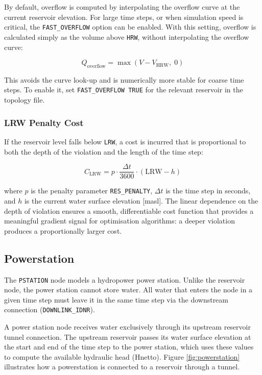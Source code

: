 \documentclass[a4paper, 12pt]{report}
\begin{document}
	By default, overflow is computed by interpolating the overflow curve at the current reservoir
	elevation. For large time steps, or when simulation speed is critical, the \texttt{FAST\_OVERFLOW}
	option can be enabled. With this setting, overflow is calculated simply as the volume above
	\texttt{HRW}, without interpolating the overflow curve:

	$$Q_\mathrm{overflow} = \max\!\left(V - V_\mathrm{HRW},\; 0\right)$$

	This avoids the curve look-up and is numerically more stable for coarse time steps. To enable
	it, set \texttt{FAST\_OVERFLOW TRUE} for the relevant reservoir in the topology file.

	\subsubsection{LRW Penalty Cost}
	\label{subsubsec:lrw_penalty}

	If the reservoir level falls below \texttt{LRW}, a cost is incurred that is proportional to
	both the depth of the violation and the length of the time step:

	$$C_\mathrm{LRW} = p \cdot \frac{\Delta t}{3600} \cdot \left(\mathrm{LRW} - h\right)$$

	where $p$ is the penalty parameter \texttt{RES\_PENALTY}, $\Delta t$ is the time step in
	seconds, and $h$ is the current water surface elevation [masl]. The linear dependence on the
	depth of violation ensures a smooth, differentiable cost function that provides a meaningful
	gradient signal for optimisation algorithms: a deeper violation produces a proportionally
	larger cost.

	\newpage


	\subsection{Powerstation}
	\label{subsec:powerstation}

	The \texttt{PSTATION} node models a hydropower power station. Unlike the reservoir node, the
	power station cannot store water. All water that enters the node in a given time step must leave it
	in the same time step via the downstream connection (\texttt{DOWNLINK\_IDNR}).

	A power station node receives water exclusively through its upstream reservoir tunnel
	connection. The upstream reservoir passes its water surface elevation at the start and end of
	the time step to the power station, which uses these values to compute the available hydraulic
	head (Hnetto). Figure \ref{fig:powerstation} illustrates how a powerstation is connected to a reservoir through a tunnel. 
\end{document}
